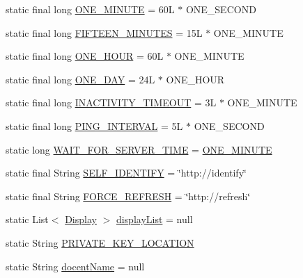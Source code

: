 \begin{DoxyCompactItemize}
\item 
static final long \hyperlink{classgov_1_1fnal_1_1ppd_1_1dd_1_1GlobalVariables_a79fc1e35198b44168537a85aa4c2d942}{O\-N\-E\-\_\-\-M\-I\-N\-U\-T\-E} = 60\-L $\ast$ O\-N\-E\-\_\-\-S\-E\-C\-O\-N\-D
\item 
static final long \hyperlink{classgov_1_1fnal_1_1ppd_1_1dd_1_1GlobalVariables_ae09d2d42603daf3b4d5fccd1c489a93b}{F\-I\-F\-T\-E\-E\-N\-\_\-\-M\-I\-N\-U\-T\-E\-S} = 15\-L $\ast$ O\-N\-E\-\_\-\-M\-I\-N\-U\-T\-E
\item 
static final long \hyperlink{classgov_1_1fnal_1_1ppd_1_1dd_1_1GlobalVariables_a947f75994e24bb52604adf3699920579}{O\-N\-E\-\_\-\-H\-O\-U\-R} = 60\-L $\ast$ O\-N\-E\-\_\-\-M\-I\-N\-U\-T\-E
\item 
static final long \hyperlink{classgov_1_1fnal_1_1ppd_1_1dd_1_1GlobalVariables_aef5cbdf53c9830ae609987b805a08998}{O\-N\-E\-\_\-\-D\-A\-Y} = 24\-L $\ast$ O\-N\-E\-\_\-\-H\-O\-U\-R
\item 
static final long \hyperlink{classgov_1_1fnal_1_1ppd_1_1dd_1_1GlobalVariables_ab33d116e6a83d46d778ee5c3521a39a4}{I\-N\-A\-C\-T\-I\-V\-I\-T\-Y\-\_\-\-T\-I\-M\-E\-O\-U\-T} = 3\-L $\ast$ O\-N\-E\-\_\-\-M\-I\-N\-U\-T\-E
\item 
static final long \hyperlink{classgov_1_1fnal_1_1ppd_1_1dd_1_1GlobalVariables_ac2e535e1d551e5eae9749ad1ff4eeccf}{P\-I\-N\-G\-\_\-\-I\-N\-T\-E\-R\-V\-A\-L} = 5\-L $\ast$ O\-N\-E\-\_\-\-S\-E\-C\-O\-N\-D
\item 
static long \hyperlink{classgov_1_1fnal_1_1ppd_1_1dd_1_1GlobalVariables_ab1fa16703a549d62b7ceaf50f6beb881}{W\-A\-I\-T\-\_\-\-F\-O\-R\-\_\-\-S\-E\-R\-V\-E\-R\-\_\-\-T\-I\-M\-E} = \hyperlink{classgov_1_1fnal_1_1ppd_1_1dd_1_1GlobalVariables_a79fc1e35198b44168537a85aa4c2d942}{O\-N\-E\-\_\-\-M\-I\-N\-U\-T\-E}
\item 
static final String \hyperlink{classgov_1_1fnal_1_1ppd_1_1dd_1_1GlobalVariables_aaaf6fe49f89ce39ddba1fac773161acf}{S\-E\-L\-F\-\_\-\-I\-D\-E\-N\-T\-I\-F\-Y} = \char`\"{}http\-://identify\char`\"{}
\item 
static final String \hyperlink{classgov_1_1fnal_1_1ppd_1_1dd_1_1GlobalVariables_a79c44481889ff937b51e30d13d9c1c35}{F\-O\-R\-C\-E\-\_\-\-R\-E\-F\-R\-E\-S\-H} = \char`\"{}http\-://refresh\char`\"{}
\item 
static List$<$ \hyperlink{interfacegov_1_1fnal_1_1ppd_1_1dd_1_1signage_1_1Display}{Display} $>$ \hyperlink{classgov_1_1fnal_1_1ppd_1_1dd_1_1GlobalVariables_a30efdc2ab60dd04f76dc1210b8447426}{display\-List} = null
\item 
static String \hyperlink{classgov_1_1fnal_1_1ppd_1_1dd_1_1GlobalVariables_aa26c21d05850efb85c8f5517d8258e5d}{P\-R\-I\-V\-A\-T\-E\-\_\-\-K\-E\-Y\-\_\-\-L\-O\-C\-A\-T\-I\-O\-N}
\item 
static String \hyperlink{classgov_1_1fnal_1_1ppd_1_1dd_1_1GlobalVariables_a1a8699e7b2ec1e9cad652869fedafa2b}{docent\-Name} = null
\end{DoxyCompactItemize}


